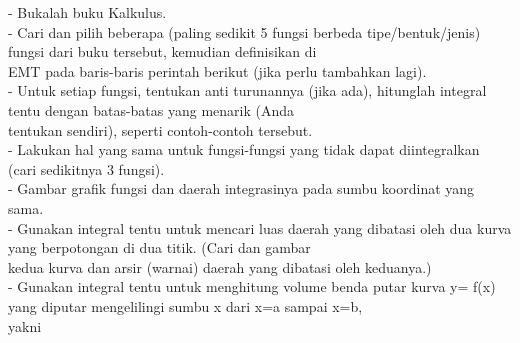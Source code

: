 \documentclass[12pt,arial,letterpaper]{book}
\begin{document}
\begin{eulernootebook}
\begin{eulercomment}
\begin{eulercomment}
\begin{eulernootebook}
\begin{eulercomment}
\begin{eulercomment}
\begin{eulercomment}
\begin{eulercomment}
\begin{eulercomment}
\begin{eulercomment}
\begin{eulernotebook}
\begin{eulercomment}
\begin{eulercomment}
\begin{eulercomment}
\begin{eulercomment}
\begin{eulercomment}
\begin{eulercomment}
\begin{eulercomment}
\begin{eulercomment}
\begin{eulercomment}
\begin{eulercomment}
\begin{eulercomment}
\begin{eulercomment}
\begin{eulercomment}
\begin{eulercomment}
\begin{eulercomment}
\begin{eulercomment}
\begin{eulercomment}
\begin{eulercomment}
\begin{eulercomment}
\begin{eulercomment}
\begin{eulercomment}
\begin{eulercomment}
\begin{eulercomment}
- Bukalah buku Kalkulus.\\
- Cari dan pilih beberapa (paling sedikit 5 fungsi berbeda
tipe/bentuk/jenis) fungsi dari buku tersebut, kemudian definisikan di\\
EMT pada baris-baris perintah berikut (jika perlu tambahkan lagi).\\
- Untuk setiap fungsi, tentukan anti turunannya (jika ada), hitunglah
integral tentu dengan batas-batas yang menarik (Anda\\
tentukan sendiri), seperti contoh-contoh tersebut.\\
- Lakukan hal yang sama untuk fungsi-fungsi yang tidak dapat
diintegralkan (cari sedikitnya 3 fungsi).\\
- Gambar grafik fungsi dan daerah integrasinya pada sumbu koordinat
yang sama.\\
- Gunakan integral tentu untuk mencari luas daerah yang dibatasi oleh
dua kurva yang berpotongan di dua titik. (Cari dan gambar\\
kedua kurva dan arsir (warnai) daerah yang dibatasi oleh keduanya.)\\
- Gunakan integral tentu untuk menghitung volume benda putar kurva y=
f(x) yang diputar mengelilingi sumbu x dari x=a sampai x=b,\\
yakni


\end{eulercomment}
\end{eulercomment}
\end{eulercomment}
\end{eulercomment}
\end{eulercomment}
\end{eulercomment}
\end{eulercomment}
\end{eulercomment}
\end{eulercomment}
\end{eulercomment}
\end{eulercomment}
\end{eulercomment}
\end{eulercomment}
\end{eulercomment}
\end{eulercomment}
\end{eulercomment}
\end{eulercomment}
\end{eulercomment}
\end{eulercomment}
\end{eulercomment}
\end{eulercomment}
\end{eulercomment}
\end{eulercomment}
\end{eulernotebook}
\end{eulercomment}
\end{eulercomment}
\end{eulercomment}
\end{eulercomment}
\end{eulercomment}
\end{eulercomment}
\end{eulernootebook}
\end{eulercomment}
\end{eulercomment}
\end{eulernootebook}
\end{document}
